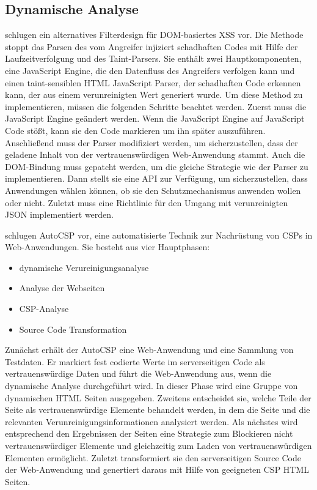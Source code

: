 \subsection{Dynamische Analyse}
\label{subsection:Method2}

\textcite[655]{stock2014} schlugen ein alternatives Filterdesign für DOM-basiertes XSS vor. Die Methode stoppt das Parsen des vom Angreifer injiziert schadhaften Codes mit Hilfe der Laufzeitverfolgung und des Taint-Parsers. Sie enthält zwei Hauptkomponenten, eine JavaScript Engine, die den Datenfluss des Angreifers verfolgen kann und einen taint-sensiblen HTML JavaScript Parser, der schadhaften Code erkennen kann, der aus einem verunreinigten Wert generiert wurde. Um diese Method zu implementieren, müssen die folgenden Schritte beachtet werden. Zuerst muss die JavaScript Engine geändert werden. Wenn die JavaScript Engine auf JavaScript Code stößt, kann sie den Code markieren um ihn später auszuführen. Anschließend muss der Parser modifiziert werden, um sicherzustellen, dass der geladene Inhalt von der vertrauenswürdigen Web-Anwendung stammt. Auch die DOM-Bindung muss gepatcht werden, um die gleiche Strategie wie der Parser zu implementieren. Dann stellt sie eine API zur Verfügung, um sicherzustellen, dass Anwendungen wählen können, ob sie den Schutzmechanismus anwenden wollen oder nicht. Zuletzt muss eine Richtlinie für den Umgang mit verunreinigten JSON implementiert werden.


\textcite[339]{fazzini2015} schlugen AutoCSP vor, eine automatisierte Technik zur Nachrüstung von CSPs in Web-Anwendungen. Sie besteht aus vier Hauptphasen:
\begin{itemize}
	\item dynamische Verureinigungsanalyse
	\item Analyse der Webseiten
	\item CSP-Analyse
	\item Source Code Transformation
\end{itemize}
Zunächst erhält der AutoCSP eine Web-Anwendung und eine Sammlung von Testdaten. Er markiert fest codierte Werte im serverseitigen Code als vertrauenswürdige Daten und führt die Web-Anwendung aus, wenn die dynamische Analyse durchgeführt wird. In dieser Phase wird eine Gruppe von dynamischen HTML Seiten ausgegeben. Zweitens entscheidet sie, welche Teile der Seite als vertrauenswürdige Elemente behandelt werden, in dem die Seite und die relevanten Verunreinigungsinformationen analysiert werden. Als nächstes wird entsprechend den Ergebnissen der Seiten eine Strategie zum Blockieren nicht vertrauenswürdiger Elemente und gleichzeitig zum Laden von vertrauenswürdigen Elementen ermöglicht. Zuletzt transformiert sie den serverseitigen Source Code der Web-Anwendung und genertiert daraus mit Hilfe von geeigneten CSP HTML Seiten.


